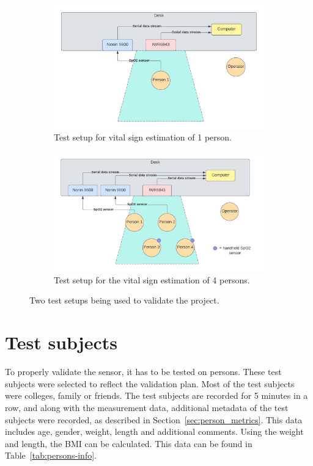 \begin{figure}[t]
\begin{subfigure}{\textwidth}
  \centering
  \includegraphics[width=.6\linewidth]{figures/validation/test_setup_1.pdf}  
  \caption{Test setup for vital sign estimation of 1 person.}
  \label{fig:test_setup_1}
\end{subfigure}
\begin{subfigure}{\textwidth}
  \centering
  \includegraphics[width=.6\linewidth]{figures/validation/test_setup_4.pdf}  
  \caption{Test setup for the vital sign estimation of 4 persons.}
  \label{fig:test_setup_4}
\end{subfigure}
\caption{Two test setups being used to validate the project.}
\label{fig:test_setup}
\end{figure}

\section{Test subjects}
To properly validate the sensor, it has to be tested on persons. These test subjects were selected to reflect the validation plan. Most of the test subjects were colleges, family or friends. The test subjects are recorded for 5 minutes in a row, and along with the measurement data, additional metadata of the test subjects were recorded, as described in Section~\ref{sec:person_metrics}. This data includes age, gender, weight, length and additional comments. Using the weight and length, the BMI can be calculated. This data can be found in Table~\ref{tab:persons-info}.

